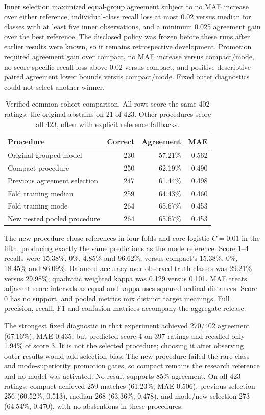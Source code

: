 \documentclass{article}
\begin{document}
Inner selection maximized equal-group agreement subject to no MAE increase over either reference, individual-class recall loss at most 0.02 versus median for classes with at least five inner observations, and a minimum 0.025 agreement gain over the best reference. The disclosed policy was frozen before these runs after earlier results were known, so it remains retrospective development. Promotion required agreement gain over compact, no MAE increase versus compact/mode, no score-specific recall loss above 0.02 versus compact, and positive descriptive paired agreement lower bounds versus compact/mode. Fixed outer diagnostics could not select another winner.

\begin{table}[ht]
\caption{Verified common-cohort comparison. All rows score the same 402 ratings; the original abstains on 21 of 423. Other procedures score all 423, often with explicit reference fallbacks.}
\centering\small
\begin{tabular}{@{}l r r r@{}}
\toprule Procedure & Correct & Agreement & MAE \\
\midrule
Original grouped model & 230 & 57.21\% & 0.562 \\
Compact procedure & 250 & 62.19\% & 0.490 \\
Previous agreement selection & 247 & 61.44\% & 0.498 \\
Fold training median & 259 & 64.43\% & 0.460 \\
Fold training mode & 264 & 65.67\% & 0.453 \\
New nested pooled procedure & 264 & 65.67\% & 0.453 \\
\bottomrule
\end{tabular}
\end{table}

The new procedure chose references in four folds and core logistic $C=0.01$ in the fifth, producing exactly the same predictions as the mode reference. Score 1--4 recalls were 15.38\%, 0\%, 4.85\% and 96.62\%, versus compact's 15.38\%, 0\%, 18.45\% and 86.09\%. Balanced accuracy over observed truth classes was 29.21\% versus 29.98\%; quadratic weighted kappa was 0.129 versus 0.101. MAE treats adjacent score intervals as equal and kappa uses squared ordinal distances. Score 0 has no support, and pooled metrics mix distinct target meanings. Full precision, recall, F1 and confusion matrices accompany the aggregate release.

The strongest fixed diagnostic in that experiment achieved 270/402 agreement (67.16\%), MAE 0.435, but predicted score 4 on 397 ratings and recalled only 1.94\% of score 3. It is not the selected procedure; choosing it after observing outer results would add selection bias. The new procedure failed the rare-class and mode-superiority promotion gates, so compact remains the research reference and no model was activated. No result supports 85\% agreement. On all 423 ratings, compact achieved 259 matches (61.23\%, MAE 0.506), previous selection 256 (60.52\%, 0.513), median 268 (63.36\%, 0.478), and mode/new selection 273 (64.54\%, 0.470), with no abstentions in these procedures.
\end{document}
